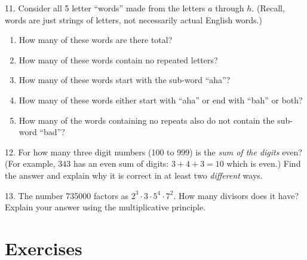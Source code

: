 \documentclass[10pt,]{book}
\theoremstyle{plain}
\theoremstyle{definition}
\numberwithin{equation}{chapter}
\begin{document}
\begin{exerciselist}
\par\smallskip
\item[11.]\hypertarget{exercise-53}{}
          Consider all 5 letter ``words'' made from the letters \(a\) through \(h\). (Recall, words are just strings of letters, not necessarily actual English words.)
        \leavevmode%
\begin{enumerate}[label=(\alph*)]
\item\hypertarget{li-204}{}
              How many of these words are there total?
\item\hypertarget{li-205}{}
              How many of these words contain no repeated letters?
\item\hypertarget{li-206}{}
              How many of these words start with the sub-word ``aha''?
\item\hypertarget{li-207}{}
              How many of these words either start with ``aha'' or end with ``bah'' or both?
\item\hypertarget{li-208}{}
              How many of the words containing no repeats also do not contain the sub-word ``bad''?%
\end{enumerate}

\par\smallskip
\item[12.]\hypertarget{exercise-54}{}
          For how many three digit numbers (100 to 999) is the \emph{sum of the digits} even? (For example, \(343\) has an even sum of digits: \(3+4+3 = 10\) which is even.) Find the answer and explain why it is correct in at least two \emph{different} ways.
\par\smallskip
\item[13.]\hypertarget{exercise-55}{}
        The number 735000 factors as \(2^3 \cdot 3 \cdot 5^4 \cdot 7^2\). How many divisors does it have? Explain your answer using the multiplicative principle.
\par\smallskip
\end{exerciselist}
\typeout{************************************************}
\typeout{************************************************}
\section[Exercises]{Exercises}\label{section-6}
\typeout{************************************************}
\typeout{************************************************}
\end{document}
